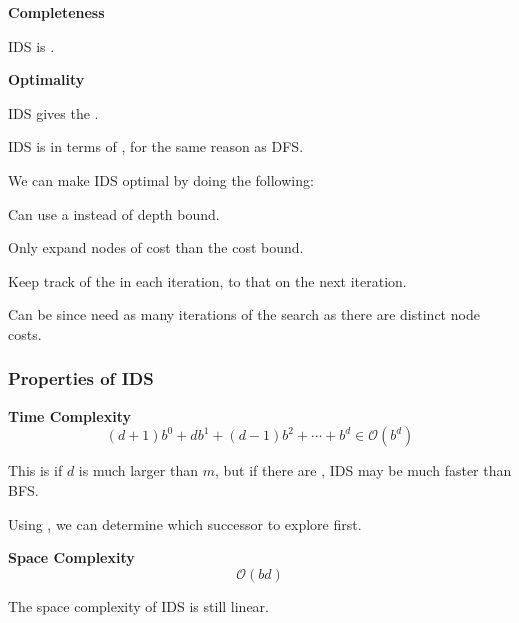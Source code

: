 \begin{listu}
    \item \textbf{Completeness}
    
    \begin{listu}
        \item IDS is . 
    \end{listu}

    \item \textbf{Optimality}
    
    \begin{listu}
        \item IDS gives the .

        \item IDS is  in terms of , for the same reason as DFS.
        
        We can make IDS optimal by doing the following:

        \begin{listu}
            \item Can use a  instead of depth bound.
            \item Only expand nodes of cost  than the cost bound. 
            \item Keep track of the  in each iteration,  to that on the next iteration.
            \item Can be  since need as many iterations of the search as there are distinct node costs.
        \end{listu}
    \end{listu}
\end{listu}

\subsubsection{Properties of IDS}

\begin{listu}
    \item \textbf{Time Complexity} \[
        (d+1)b^0 + db^1 + (d-1)b^2 + \cdots + b^d \in \mathcal{O}(b^d)
    \]

    \begin{listu}
        \item This is  if $d$ is much larger than $m$, but if there are , IDS may be much faster than BFS.
        \item Using , we can determine which successor to explore first. 
    \end{listu}

    \item \textbf{Space Complexity} \[
        \mathcal{O}(bd)
    \]
    
    The space complexity of IDS is still linear. 
\end{listu}